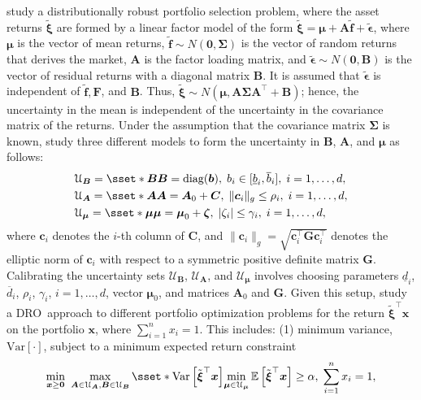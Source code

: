 \documentclass[final,onefignum,onetabnum]{class}
\newcommand{\e}[1]{\mathbb{E} \left[ #1 \right]}
\newcommand{\Var}[1]{\mathrm{Var} \left[ #1 \right]}
\newcommand{\bs}[1]{\boldsymbol{#1}} %
\newcommand{\Cs}[1]{\mathcal{#1}} %
\newcommand{\txi}{\tilde{\bs{\xi}}}
\newcommand{\tbs}[1]{\tilde{\bs{#1}}}
\newcommand{\ul}[1]{\underline{#1}}
\newcommand{\ol}[1]{\overline{#1}}
\newcommand{\dro}{DRO}
\begin{document}
\citet{goldfarb2003} study a distributionally robust portfolio selection problem, where the asset returns $\txi$ are formed by a linear factor model of the form  $\txi=\bs{\mu} + \bs{A} \tbs{f} + \tbs{\epsilon}$, where $\bs{\mu}$ is the vector of mean returns, $\tbs{f} \sim N(\bs{0}, \bs{\Sigma})$ is the vector of random returns that derives the market, $\bs{A}$ is the factor loading matrix, and $\tbs{\epsilon} \sim N(\bs{0}, \bs{B})$ is the vector of residual returns with a diagonal matrix $\bs{B}$. It is assumed that $\tbs{\epsilon}$ is independent of $\tbs{f}, \bs{F}$, and $\bs{B}$. Thus, $\txi \sim N(\bs{\mu}, \bs{A}\bs{\Sigma}\bs{A}^{\top} + \bs{B})$; hence, the  uncertainty in the mean is independent of  the uncertainty in the covariance matrix of the returns. 
Under the assumption that the covariance matrix $\bs{\Sigma}$ is known, \citet{goldfarb2003} study three different models to form the uncertainty in $\bs{B}$, $\bs{A}$, and $\bs{\mu}$ as follows:
\begin{align}
    & \Cs{U}_{\bs{B}}=\sset*{\bs{B}}{\bs{B}=\text{diag}(\bs{b}), \; b_{i} \in [\ul{b}_{i}, \ol{b}_{i}], \; i=1, \ldots, d}, \label{eq: A}\\
    & \Cs{U}_{\bs{A}}=\sset*{\bs{A}}{\bs{A}=\bs{A}_{0}+ \bs{C}, \; \|\bs{c}_{i}\|_{g} \le \rho_{i}, \; i=1, \ldots, d}, \label{eq: B}\\
    & \Cs{U}_{\bs{\mu}}=\sset*{\bs{\mu}}{\bs{\mu}=\bs{\mu}_{0}+ \bs{\zeta}, \; |\zeta_{i}| \le \gamma_{i}, \; i=1, \ldots, d}, \label{eq: mu}
\end{align}
where $\bs{c}_{i}$ denotes the $i$-th column of $\bs{C}$, and $\|\bs{c}_{i}\|_{g}=\sqrt{\bs{c}_{i}^{\top} \bs{G} \bs{c}_{i}^{\top}}$ denotes the elliptic norm of $\bs{c}_{i}$ with respect to a symmetric positive definite matrix $\bs{G}$. 
Calibrating the uncertainty sets $\Cs{U}_{\bs{B}}$, $\Cs{U}_{\bs{A}}$, and $\Cs{U}_{\bs{\mu}}$ involves choosing parameters $\ul{d}_{i}$, $\ol{d}_{i}$, $\rho_{i}$, $\gamma_{i}$, $i=1, \ldots, d$, vector $\bs{\mu}_{0}$, and matrices $\bs{A}_{0}$ and $\bs{G}$. 
Given this setup, \citet{goldfarb2003} study a \dro\ approach to different portfolio optimization problems for the return $\txi^{\top} \bs{x}$ on the portfolio $\bs{x}$, where $\sum_{i=1}^{n} x_{i}=1$. This includes:
(1) minimum variance, $\Var{\cdot}$, subject to a minimum expected return constraint
$$\min_{\bs{x} \ge \bs{0}} \ \max_{\bs{A} \in \Cs{U}_{\bs{A}}, \bs{B} \in \Cs{U}_{\bs{B}}} \sset*{\Var{\txi^{\top} \bs{x}}}{\min_{\bs{\mu} \in \Cs{U}_{\bs{\mu}}} \e{\txi^{\top} \bs{x}} \ge \alpha , \; \sum_{i=1}^{n} x_{i}=1}, $$
\end{document}
